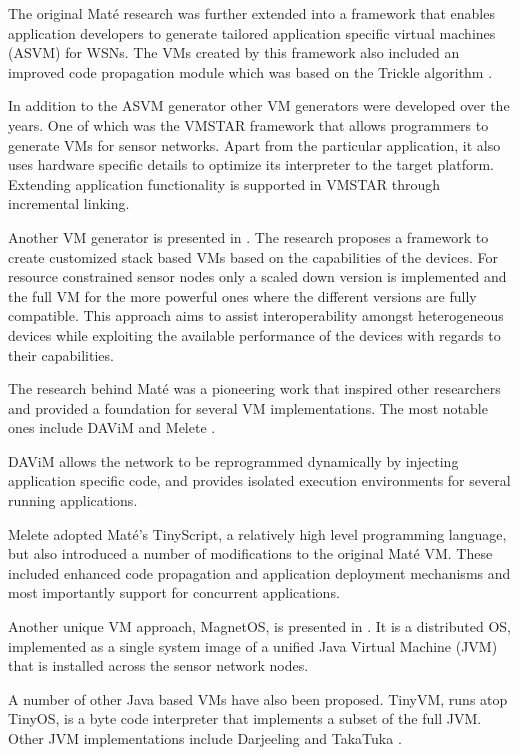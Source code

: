 The original Maté research was further extended into a framework that enables application developers to generate tailored application specific virtual machines (ASVM) \cite{levis2004bridging} for WSNs. The VMs created by this framework also included an improved code propagation module which was based on the Trickle algorithm \cite{Levis:2004:TSA:1251175.1251177}. 

In addition to the ASVM generator other VM generators were developed over the years. One of which was the VMSTAR framework \cite{koshy2005vmstar} that allows programmers to generate VMs for sensor networks. Apart from the particular application, it also uses hardware specific details to optimize its interpreter to the target platform. Extending application functionality is supported in VMSTAR through incremental linking.

Another VM generator is presented in \cite{Palmer:2004:VMG:1267242.1267243}. The research proposes a framework to create customized stack based VMs based on the capabilities of the devices. For resource constrained sensor nodes only a scaled down version is implemented and the full VM for the more powerful ones where the different versions are fully compatible. This approach aims to assist interoperability amongst heterogeneous devices while exploiting the available performance of the devices with regards to their capabilities.  

The research behind Maté was a pioneering work that inspired other researchers and provided a foundation for several VM implementations. The most notable ones include DAViM \cite{Michiels:2006:DDA:1176866.1176868}  and Melete \cite{Yu:2006:SCA:1182807.1182822}.
 
DAViM allows the network to be reprogrammed dynamically by injecting application specific code, and provides isolated execution environments for several running applications.  

Melete adopted Maté's TinyScript, a relatively high level programming language, but also introduced a number of modifications to the original Maté VM. These included enhanced code propagation and application deployment mechanisms and most importantly support for concurrent applications.

Another unique VM approach, MagnetOS, is presented in \cite{Barr:2002:NSS:509526.509528}. It is a distributed OS, implemented as a single system image of a unified Java Virtual Machine (JVM) that is installed across the sensor network nodes.

A number of other Java based VMs have also been proposed. TinyVM, \cite{hong2009tinyvm} runs atop TinyOS, is a byte code interpreter that implements a subset of the full JVM. Other JVM implementations include Darjeeling \cite{Brouwers:2009:DFV:1644038.1644056}  and TakaTuka \cite{Aslam:2008:ITJ:1460412.1460472}.  

